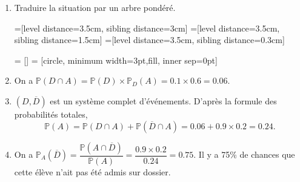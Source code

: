 \documentclass[11pt,fleqn, openany]{book} %
\begin{document}
\begin{solution}\hspace{0pt}
\begin{enumerate}
\item Traduire la situation par un arbre pondéré.


=[level distance=3.5cm, sibling distance=3cm]
=[level distance=3.5cm, sibling distance=1.5cm]
=[level distance=3.5cm, sibling distance=0.3cm]

 = []
 = [circle, minimum width=3pt,fill, inner sep=0pt]


\begin{center}
\end{center}

\item On a $\mathbb{P}(D \cap A)=\mathbb{P}(D)\times\mathbb{P}_D(A)=0.1 \times 0.6 = 0.06$.
\item $(D,\overline{D})$ est un système complet d'événements. D'après la formule des probabilités totales, \[\mathbb{P}(A)=\mathbb{P}(D \cap A)+\mathbb{P}(\overline{D} \cap A)=0.06+0.9 \times 0.2 = 0.24.\]
\item On a $\mathbb{P}_A(\overline{D})=\dfrac{\mathbb{P}(A\cap \overline{D})}{\mathbb{P}(A)}=\dfrac{0.9 \times 0.2}{0.24}=0.75$. Il y a 75\% de chances  que cette élève n'ait pas été admis sur dossier.
\end{enumerate}\end{solution}
\end{document}
